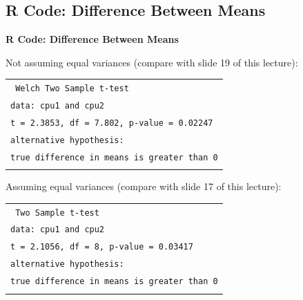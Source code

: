 \documentclass[compress]{beamer}        %
\makeatletter
\newcommand{\tcb}{\textcolor{beamer@blendedblue}}
\makeatother
\begin{document}
\subsection{R Code: Difference Between Means}
\begin{frame}{\bf \tcb{R Code: Difference Between Means}}

Not assuming equal variances (compare with slide 19 of this lecture): \\[0.2cm]
\begin{tabular}{|l|}
\hline
\texttt{ Welch Two Sample t-test}\\[0.2cm]
\texttt{data:  cpu1 and cpu2}\\
\texttt{t = 2.3853, df = 7.802, p-value = 0.02247}\\
\texttt{alternative hypothesis:}\\
\texttt{true difference in means is greater than 0}\\
\hline
\multicolumn{1}{c}{}\\[-0.0cm]
\end{tabular}

Assuming equal variances (compare with slide 17 of this lecture):\\[0.2cm]
\begin{tabular}{|l|}
\hline
\texttt{ Two Sample t-test}\\[0.2cm]
\texttt{data:  cpu1 and cpu2}\\
\texttt{t = 2.1056, df = 8, p-value = 0.03417}\\
\texttt{alternative hypothesis:}\\
\texttt{true difference in means is greater than 0}\\
\hline
\multicolumn{1}{c}{}\\[0.2cm]
\end{tabular}

\end{frame}
\end{document}
